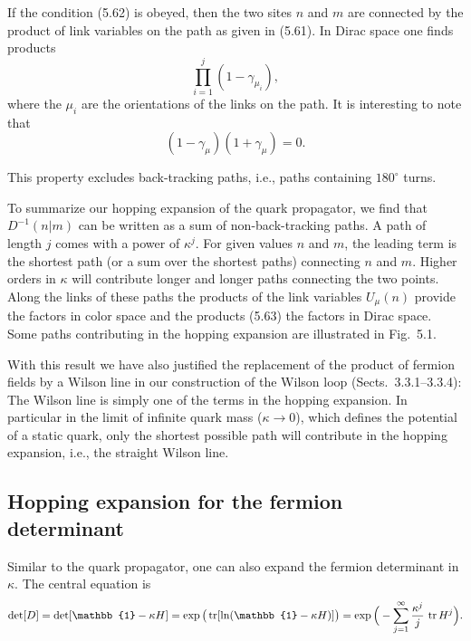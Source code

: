 If the condition (5.62) is obeyed, then the two sites $n$ and $m$ are connected
by the product of link variables on the path as given in (5.61). In Dirac space
one finds products
\begin{equation}
  \prod_{i=1}^{j}(1-\gamma_{\mu_i}) ,
\end{equation}
where the $\mu_i$ are the orientations of the links on the path. It is interesting to
note that
\begin{equation}
  (1-\gamma_\mu)(1+\gamma_\mu) = 0 .
\end{equation}

This property excludes back-tracking paths, i.e., paths containing $180^\circ$ turns.

To summarize our hopping expansion of the quark propagator, we find
that $D^{-1}(n|m)$ can be written as a sum of non-back-tracking paths. A path
of length $j$ comes with a power of $\kappa^j$. For given values $n$ and $m$, the leading
term is the shortest path (or a sum over the shortest paths) connecting $n$ and
$m$. Higher orders in $\kappa$ will contribute longer and longer paths connecting the
two points. Along the links of these paths the products of the link variables
$U_\mu(n)$ provide the factors in color space and the products (5.63) the factors in
Dirac space. Some paths contributing in the hopping expansion are illustrated
in Fig.~5.1.

With this result we have also justified the replacement of the product of fermion fields by a Wilson line in our construction of the Wilson
loop (Sects.~3.3.1--3.3.4): The Wilson line is simply one of the terms in
the hopping expansion. In particular in the limit of infinite quark mass
($\kappa \to 0$), which defines the potential of a static quark, only the shortest possible path will contribute in the hopping expansion, i.e., the straight
Wilson line.

\subsection{Hopping expansion for the fermion determinant}

Similar to the quark propagator, one can also expand the fermion determinant
in $\kappa$. The central equation is
\begin{equation}
  \det[D] = \det[\mathbb{1}-\kappa H] = \exp\big(\tr[\ln(\mathbb{1}-\kappa H)]\big)
    = \exp\Big(-\sum_{j=1}^{\infty}\frac{\kappa^j}{j}\,\tr H^j\Big) .
\end{equation}

